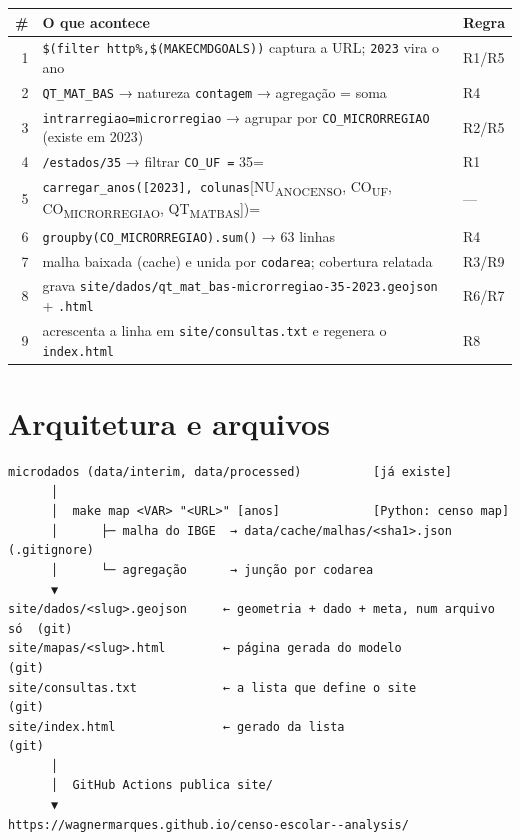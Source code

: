 \documentclass[11pt]{article}
\begin{document}
\begin{center}
\begin{tabular}{rll}
\# & O que acontece & Regra\\
\hline
1 & \texttt{\$(filter http\%,\$(MAKECMDGOALS))} captura a URL; \texttt{2023} vira o ano & R1/R5\\
2 & \texttt{QT\_MAT\_BAS} → natureza \texttt{contagem} → agregação = soma & R4\\
3 & \texttt{intrarregiao=microrregiao} → agrupar por \texttt{CO\_MICRORREGIAO} (existe em 2023) & R2/R5\\
4 & \texttt{/estados/35} → filtrar \texttt{CO\_UF =} 35= & R1\\
5 & \texttt{carregar\_anos([2023], colunas}{[}NU\textsubscript{ANO}\textsubscript{CENSO}, CO\textsubscript{UF}, CO\textsubscript{MICRORREGIAO}, QT\textsubscript{MAT}\textsubscript{BAS}])= & —\\
6 & \texttt{groupby(CO\_MICRORREGIAO).sum()} → 63 linhas & R4\\
7 & malha baixada (cache) e unida por \texttt{codarea}; cobertura relatada & R3/R9\\
8 & grava \texttt{site/dados/qt\_mat\_bas-microrregiao-35-2023.geojson} + \texttt{.html} & R6/R7\\
9 & acrescenta a linha em \texttt{site/consultas.txt} e regenera o \texttt{index.html} & R8\\
\end{tabular}
\end{center}
\section{Arquitetura e arquivos}
\label{sec:org819c827}

\begin{verbatim}
microdados (data/interim, data/processed)          [já existe]
      │
      │  make map <VAR> "<URL>" [anos]             [Python: censo map]
      │      ├─ malha do IBGE  → data/cache/malhas/<sha1>.json   (.gitignore)
      │      └─ agregação      → junção por codarea
      ▼
site/dados/<slug>.geojson     ← geometria + dado + meta, num arquivo só  (git)
site/mapas/<slug>.html        ← página gerada do modelo                  (git)
site/consultas.txt            ← a lista que define o site                (git)
site/index.html               ← gerado da lista                          (git)
      │
      │  GitHub Actions publica site/
      ▼
https://wagnermarques.github.io/censo-escolar--analysis/
\end{verbatim}
\end{document}
